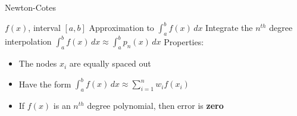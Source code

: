 \documentclass[10pt]{beamer}
\begin{document}
\begin{frame}{Newton-Cotes}

    {$f(x)$, interval $[a,b]$}
    {Approximation to $\int_a^bf(x)\,dx$}
    {Integrate the $n^{th}$ degree interpolation $\int_a^bf(x)\,dx \approx \int_a^b p_n(x)\,dx$}
    \vfill
    Properties: 
    \begin{itemize}
        \item The nodes $x_i$ are equally spaced out
        \item Have the form $ \int_a^b f(x)\, dx \approx \sum_{i=1}^n w_i f(x_i) $
        \item If $f(x)$ is an $n^{th}$ degree polynomial, then error is \textbf{zero}
    \end{itemize}

\end{frame}


\end{document}
